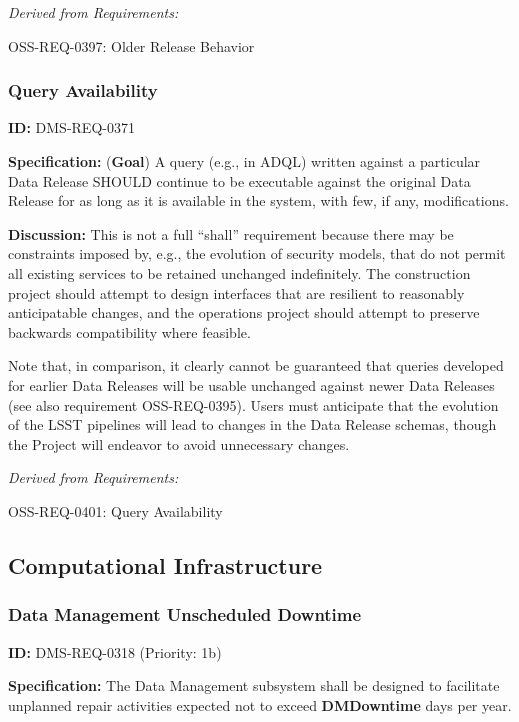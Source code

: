 \documentclass[SE,toc,lsstdraft]{lsstdoc}
\begin{document}
\emph{Derived from Requirements:}

OSS-REQ-0397:
Older Release Behavior \newline

\subsubsection{Query Availability}

\label{DMS-REQ-0371}
\textbf{ID:} DMS-REQ-0371

\textbf{Specification:}
(\textbf{Goal}) A query (e.g., in ADQL) written against a particular Data Release SHOULD continue to be executable against the original Data Release for as long as it is available in the system, with few, if any, modifications.

\textbf{Discussion:}
This is not a full “shall” requirement because there may be constraints imposed by, e.g., the evolution of security models, that do not permit all existing services to be retained unchanged indefinitely. The construction project should attempt to design interfaces that are resilient to reasonably anticipatable changes, and the operations project should attempt to preserve backwards compatibility where feasible.

Note that, in comparison, it clearly cannot be guaranteed that queries developed for earlier Data Releases will be usable unchanged against newer Data Releases (see also requirement OSS-REQ-0395). Users must anticipate that the evolution of the LSST pipelines will lead to changes in the Data Release schemas, though the Project will endeavor to avoid unnecessary changes.

\emph{Derived from Requirements:}

OSS-REQ-0401:
Query Availability \newline

\subsection{Computational Infrastructure}

\subsubsection{Data Management Unscheduled Downtime}

\label{DMS-REQ-0318}
\textbf{ID:} DMS-REQ-0318 (Priority: 1b)

\textbf{Specification:} The Data Management subsystem shall be designed to facilitate unplanned repair activities expected not to exceed \textbf{DMDowntime} days per year.
\end{document}
